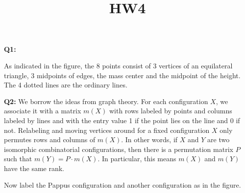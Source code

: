 \documentclass[12pt,reqno]{amsart}
\theoremstyle{definition}
\begin{document}
\title{HW4}

\noindent \textbf{Q1:}

\begin{center}
\end{center}


As indicated in the figure, the 8 points consist of 3 vertices of an equilateral triangle, 3 midpoints of edges, the mass center and the midpoint of the height. The 4 dotted lines are the ordinary lines.

\newpage
\noindent \textbf{Q2:} We borrow the ideas from graph theory. For each configuration $X$, we associate it with a matrix $m(X)$ with rows labeled by points and columns labeled by lines and with the entry value 1 if the point lies on the line and 0 if not. Relabeling and moving vertices around for a fixed configuration $X$ only permutes rows and columns of $m(X)$. In other words, if $X$ and $Y$ are two isomorphic combinatorial configurations, then there is a permutation matrix $P$ such that $m(Y)=P\cdot m(X)$. In particular, this means $m(X)$ and $m(Y)$ have the same rank.

Now label the Pappus configuration and another configuration as in the figure.
\end{document}
